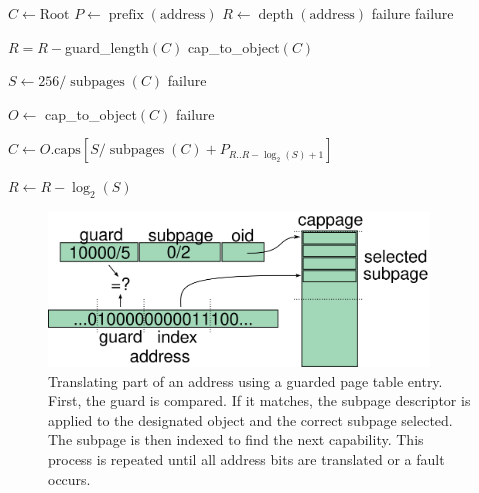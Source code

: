\begin{algorithmic}
\STATE $C \leftarrow \mbox{Root}$
\STATE $P \leftarrow \mathop{prefix}(\mbox{address})$
\STATE $R \leftarrow \mathop{depth}(\mbox{address})$
\LOOP
    \RETURN failure 
  \ENDIF
    \RETURN failure 
  \ENDIF

  \STATE $R = R - $guard\_length$(C)$
    \RETURN cap\_to\_object$(C)$
  \ENDIF

  \STATE $S \leftarrow 256/\mathop{subpages}(C)$ 
    \RETURN failure 
  \ENDIF

  \STATE $O \leftarrow $ cap\_to\_object$(C)$
    \RETURN failure 
  \ENDIF

  \STATE $C \leftarrow
    O.\mbox{caps}\left[S/\mathop{subpages}(C)
    + P_{R..R-\log_2(S)+1}\right]$ 

  \STATE $R \leftarrow R - \log_2(S)$
\ENDLOOP
\end{algorithmic}

\begin{figure}
  \begin{center}
    \includegraphics[width=0.9\textwidth]{gpt}
  \end{center}
  \caption[Address Translation]{Translating part of an address using a
    guarded page table entry.  First, the guard is compared.  If it
    matches, the subpage descriptor is applied to the designated
    object and the correct subpage selected.  The subpage is then
    indexed to find the next capability.  This process is repeated
    until all address bits are translated or a fault occurs.}
  \label{fig:address-translation}
\end{figure}

